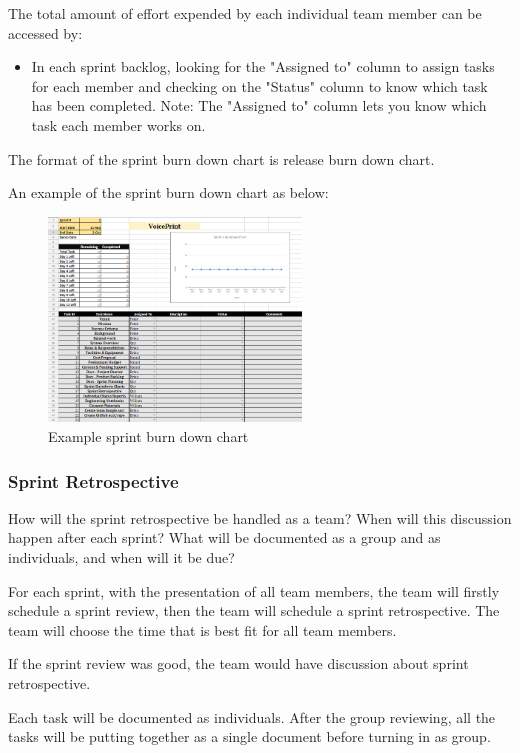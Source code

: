 The total amount of effort expended by each individual team member can be accessed by:

\begin{itemize}
    
\item In each sprint backlog, looking for the "Assigned to" column to assign tasks for each member and checking on the "Status" column to know which task has been completed. 
Note: The "Assigned to" column lets you know which task each member works on.

\end{itemize}

The format of the sprint burn down chart is release burn down chart.

An example of the sprint burn down chart as below:

\begin{figure}[h!]
	\centering
   	\includegraphics[width=0.6\textwidth]{images/Chart.png}
    \caption{Example sprint burn down chart}
\end{figure}

\subsubsection{Sprint Retrospective}
How will the sprint retrospective be handled as a team? When will this discussion happen after each sprint? What will be documented as a group and as individuals, and when will it be due?

For each sprint, with the presentation of all team members, the team will firstly schedule a sprint review, then the team will schedule a sprint retrospective. The team will choose the time that is best fit for all team members.

If the sprint review was good, the team would have discussion about sprint retrospective. 

Each task will be documented as individuals. After the group reviewing, all the tasks will be putting together as a single document before turning in as group.

